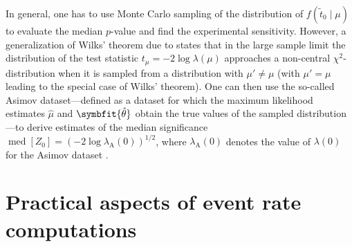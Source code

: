 \documentclass[b5paper, 10pt, twoside]{book}
\newcommand{\unitv}[1]{\symbfit{\hat{#1}}}
\DeclareMathOperator{\med}{med}
\begin{document}
In general, one has to use Monte Carlo sampling of the distribution of $f(\tilde{t}_0\mid\mu)$ to evaluate the median $p$-value and find the experimental sensitivity. However, a generalization of Wilks' theorem due to \textcite{Wald1943} states that in the large sample limit the distribution of the test statistic $t_\mu=-2\log\lambda(\mu)$ approaches a non-central $\chi^2$-distribution when it is sampled from a distribution with $\mu'\neq\mu$ (with $\mu'=\mu$ leading to the special case of Wilks' theorem). One can then use the so-called Asimov dataset---defined as a dataset for which the maximum likelihood estimates $\hat{\mu}$ and $\unitv{\theta}$ obtain the true values of the sampled distribution---to derive estimates of the median significance $\med[Z_0]=(-2\log\lambda_\text{A}(0))^{1/2}$, where $\lambda_\text{A}(0)$ denotes the value of $\lambda(0)$ for the Asimov dataset \parencite{CowanEtAl2011}.

\chapter{Practical aspects of event rate computations}



\backmatter

\printbibliography[heading=bibintoc, title=References]
\end{document}
